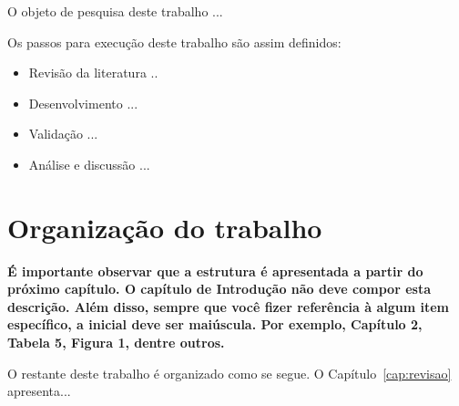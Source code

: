 O objeto de pesquisa deste trabalho ...

Os passos para execução deste trabalho são assim definidos:

\begin{itemize}
	\item Revisão da literatura ..
	\item Desenvolvimento ...
	\item Validação ...
	\item Análise e discussão ...
\end{itemize}

\section{Organização do trabalho}

\textbf{É importante observar que a estrutura é apresentada a partir do próximo capítulo. O capítulo de Introdução não deve compor esta descrição. Além disso, sempre que você fizer referência à algum item específico, a inicial deve ser maiúscula. Por exemplo, Capítulo 2, Tabela 5, Figura 1, dentre outros.}

O restante deste trabalho é organizado como se segue. O Capítulo~\ref{cap:revisao} apresenta...
